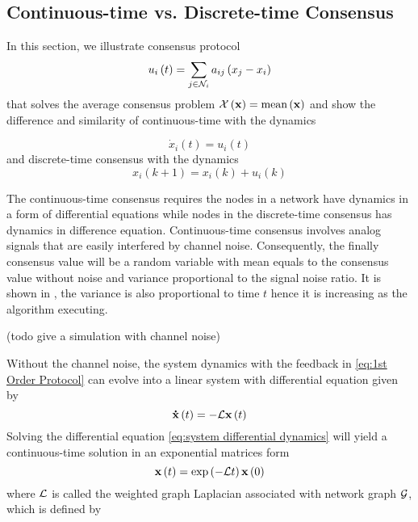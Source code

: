 \subsection{Continuous-time vs. Discrete-time Consensus}

In this section, we illustrate consensus protocol 
\begin{equation}
u_{i}\left(t\right)=\sum_{j\in{\cal N}_{i}}a_{ij}\left(x_{j}-x_{i}\right)\label{eq:1st Order Protocol}
\end{equation}
that solves the average consensus problem ${\cal X}\left(\mathbf{x}\right)=\mbox{mean}\left(\mathbf{x}\right)$
and show the difference and similarity of continuous-time with the
dynamics 

\begin{equation}
\dot{x}_{i}\left(t\right)=u_{i}\left(t\right)\label{eq:continuous-time consensus}
\end{equation}
and discrete-time consensus with the dynamics 
\begin{equation}
x_{i}\left(k+1\right)=x_{i}\left(k\right)+u_{i}\left(k\right)\label{eq:discre-time consensus}
\end{equation}


The continuous-time consensus requires the nodes in a network have
dynamics in a form of differential equations while nodes in the discrete-time
consensus has dynamics in difference equation. Continuous-time consensus
involves analog signals that are easily interfered by channel noise.
Consequently, the finally consensus value will be a random variable
with mean equals to the consensus value without noise and variance
proportional to the signal noise ratio. It is shown in \cite{Kar2009},
the variance is also proportional to time $t$ hence it is increasing
as the algorithm executing. 

(todo give a simulation with channel noise)

Without the channel noise, the system dynamics with the feedback in
\ref{eq:1st Order Protocol} can evolve into a linear system with
differential equation given by 
\begin{equation}
\mathbf{\dot{x}}\left(t\right)=-{\cal L}\mathbf{x}\left(t\right)\label{eq:system differential dynamics}
\end{equation}
Solving the differential equation \ref{eq:system differential dynamics}
will yield a continuous-time solution in an exponential matrices form
\begin{equation}
\mathbf{x}\left(t\right)=\exp\left(-{\cal L}t\right)\mathbf{x}\left(0\right)\label{eq:x(t) of CT-1st-DAC}
\end{equation}
where ${\cal L}$ is called the weighted graph Laplacian associated
with network graph ${\cal G}$, which is defined by

